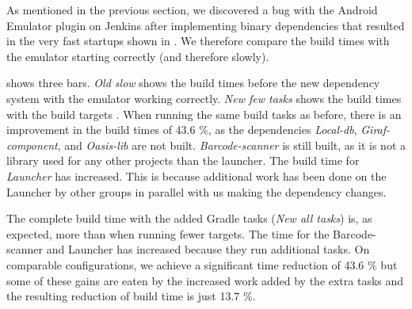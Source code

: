 As mentioned in the previous section, we discovered a bug with the Android Emulator plugin on Jenkins after implementing binary dependencies that resulted in the very fast startups shown in . We therefore compare the build times with the emulator starting correctly (and therefore slowly).

 shows three bars. \emph{Old slow} shows the build times before the new dependency system with the emulator working correctly. \emph{New few tasks} shows the build times with the build targets . When running the same build tasks as before, there is an improvement in the build times of 43.6 \%, as the dependencies \emph{Local-db}, \emph{Giraf-component}, and \emph{Oasis-lib} are not built. \emph{Barcode-scanner} is still built, as it is not a library used for any other projects than the launcher. The build time for \emph{Launcher} has increased. This is because additional work has been done on the Launcher by other groups in parallel with us making the dependency changes.

The complete build time with the added Gradle tasks (\emph{New all tasks}) is, as expected, more than when running fewer targets. The time for the Barcode-scanner and Launcher has increased because they run additional tasks. On comparable configurations, we achieve a significant time reduction of 43.6 \% but some of these gains are eaten by the increased work added by the extra tasks and the resulting reduction of build time is just 13.7 \%.

